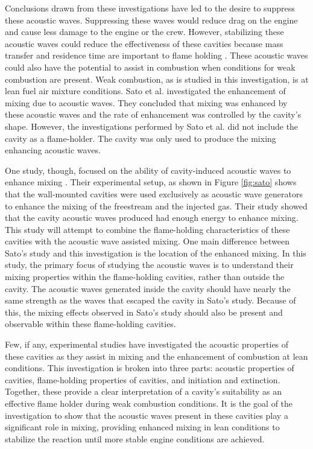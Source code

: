 Conclusions drawn from these investigations have led to the desire to suppress these acoustic waves. Suppressing these waves would reduce drag on the engine and cause less damage to the engine or the crew. However, stabilizing these acoustic waves could reduce the effectiveness of these cavities because mass transfer and residence time are important to flame holding \cite{ben2001cavity}. These acoustic waves could also have the potential to assist in combustion when conditions for weak combustion are present. Weak combustion, as is studied in this investigation, is at lean fuel air mixture conditions. Sato et al.\cite{sato1999advanced} investigated the enhancement of mixing due to acoustic waves. They concluded that mixing was enhanced by these acoustic waves and the rate of enhancement was controlled by the cavity's shape. However, the investigations performed by Sato et al. did not include the cavity as a flame-holder. The cavity was only used to produce the mixing enhancing acoustic waves. 

One study, though, focused on the ability of cavity-induced acoustic waves to enhance mixing \cite{sato1999advanced}. Their experimental setup, as shown in Figure \ref{fig:sato} shows that the wall-mounted cavities were used exclusively as acoustic wave generators to enhance the mixing of the freestream and the injected gas. Their study showed that the cavity acoustic waves produced had enough energy to enhance mixing. This study will attempt to combine the flame-holding characteristics of these cavities with the acoustic wave assisted mixing. One main difference between Sato's study and this investigation is the location of the enhanced mixing. In this study, the primary focus of studying the acoustic waves is to understand their mixing properties within the flame-holding cavities, rather than outside the cavity. The acoustic waves generated inside the cavity should have nearly the same strength as the waves that escaped the cavity in Sato's study. Because of this, the mixing effects observed in Sato's study should also be present and observable within these flame-holding cavities. 

Few, if any, experimental studies have investigated the acoustic properties of these cavities as they assist in mixing and the enhancement of combustion at lean conditions. This investigation is broken into three parts: acoustic properties of cavities, flame-holding properties of cavities, and initiation and extinction. Together, these provide a clear interpretation of a cavity's suitability as an effective flame holder during weak combustion conditions. It is the goal of the investigation to show that the acoustic waves present in these cavities play a significant role in mixing, providing enhanced mixing in lean conditions to stabilize the reaction until more stable engine conditions are achieved.


